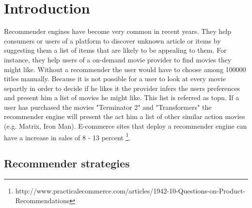 \section{Introduction}
\label{sec:intro}

Recommender engines have become very common in recent years. They help consumers or users of a platform to discover unknown article or items by suggesting them a list of items that are likely to be appealing to them. 
For instance, they help users of a on-demand movie provider to find movies they might like. Without a recommender the user would have to choose among 100000 titles manually. Because it is not possible for a user to look at every movie separtly in order to decide if he likes it the provider infers the users preferences and present him a list of movies he might like. This list is referred as \gls{topn}. If a user has purchased the movies "Terminator 2" and "Transformers" the recommender engine will present the act him a list of other similar action movies (e.g. Matrix, Iron Man).
E-commerce sites that deploy a recommender engine can have a increase in sales of 8 - 13 percent \footnote{http://www.practicalecommerce.com/articles/1942-10-Questions-on-Product-Recommendations}.

\subsection{Recommender strategies}
\label{sec:strategies}

